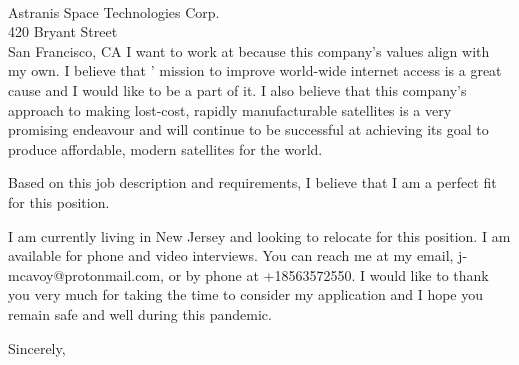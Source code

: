 \documentclass[11pt]{letter} %
\begin{document}
\begin{letter}{\\
Astranis Space Technologies Corp.\\
420 Bryant Street\\
San Francisco, CA}
I want to work at {\company} because this company's values
align with my own. I believe that {\company}' mission to improve world-wide internet
access is a great cause and I would like to be a part of it. I also believe
that this company's approach to making lost-cost, rapidly manufacturable
satellites is a very promising endeavour and will continue to be successful
at achieving its goal to produce affordable, modern satellites for the world.

Based on this job description and requirements, I believe that I am a perfect
fit for this position. 

\lifestory

I am currently living in New Jersey and looking to relocate for this position. I
am available for phone and video interviews. You can reach me at my email,
j-mcavoy@protonmail.com, or by phone at +18563572550. I would like to thank you
very much for taking the time to consider my application and I hope you remain safe
and well during this pandemic.

\closing{Sincerely,}




\end{letter}
\end{document}
